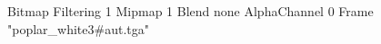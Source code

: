 {Bitmap
	{Filtering 1}
	{Mipmap 1}
	{Blend none}
	{AlphaChannel 0}
	{Frame "poplar_white3#aut.tga"}
}
